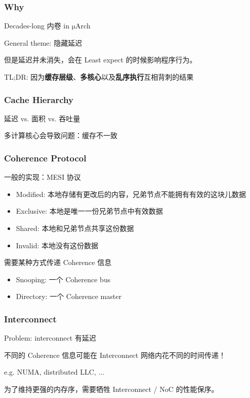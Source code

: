 \documentclass[UTF-8]{ctexbeamer}
\begin{document}
\begin{frame}
  \frametitle{Why}

  \pause

  Decades-long 内卷 in $\mathrm{\mu}$Arch

  \pause
  General theme: 隐藏延迟

  \pause
  但是延迟并未消失，会在 Least expect 的时候影响程序行为。

  \pause
  \vspace{1em}

  TL;DR: 因为\textbf{缓存层级}、\textbf{多核心}以及\textbf{乱序执行}互相背刺的结果
\end{frame}

\begin{frame}
  \frametitle{Cache Hierarchy}
  延迟 vs. 面积 vs. 吞吐量
  
  \vspace{1em}

  \pause

  多计算核心会导致问题：缓存不一致
\end{frame}

\begin{frame}
  \frametitle{Coherence Protocol}
  一般的实现：MESI 协议
  \pause
  \begin{itemize}
    \item Modified: 本地存储有更改后的内容，兄弟节点不能拥有有效的这块儿数据
    \item Exclusive: 本地是唯一一份兄弟节点中有效数据
    \item Shared: 本地和兄弟节点共享这份数据
    \item Invalid: 本地没有这份数据
  \end{itemize}
  \pause
  \vspace{1em}
  需要某种方式传递 Coherence 信息
  \pause
  \begin{itemize}
    \item Snooping: 一个 Coherence bus
    \item Directory: 一个 Coherence master
  \end{itemize}
\end{frame}

\begin{frame}
  \frametitle{Interconnect}

  Problem: interconnect 有延迟
  
  \pause
  \pause
  \vspace{1em}

  不同的 Coherence 信息可能在 Interconnect 网络内花不同的时间传递！

  \pause
  e.g. NUMA, distributed LLC, ...

  \pause

  为了维持更强的内存序，需要牺牲 Interconnect / NoC 的性能保序。
\end{frame}
\end{document}
